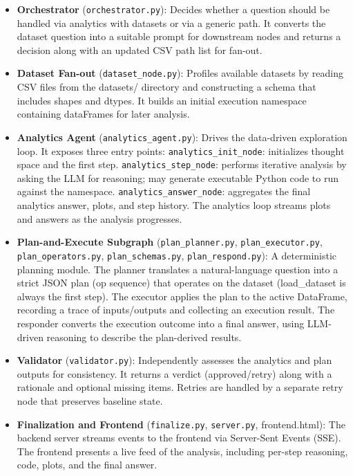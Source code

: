 \begin{itemize}
  \item \textbf{Orchestrator} (\texttt{orchestrator.py}):
    Decides whether a question should be handled via analytics with datasets or via a generic path.
    It converts the dataset question into a suitable prompt for downstream nodes and
    returns a decision along with an updated CSV path list for fan-out.

  \item \textbf{Dataset Fan-out} (\texttt{dataset\_node.py}):
    Profiles available datasets by reading CSV files from the datasets/ directory and
    constructing a schema that includes shapes and dtypes. It builds an initial execution
    namespace containing dataFrames for later analysis.

  \item \textbf{Analytics Agent} (\texttt{analytics\_agent.py}):
    Drives the data-driven exploration loop. It exposes three entry points:
    \subitem \texttt{analytics\_init\_node}: initializes thought space and the first step.
    \subitem \texttt{analytics\_step\_node}: performs iterative analysis by asking the LLM for
    reasoning; may generate executable Python code to run against the namespace.
    \subitem \texttt{analytics\_answer\_node}: aggregates the final analytics answer, plots, and step history.
    The analytics loop streams plots and answers as the analysis progresses.

  \item \textbf{Plan-and-Execute Subgraph} (\texttt{plan\_planner.py}, \texttt{plan\_executor.py}, \texttt{plan\_operators.py}, \texttt{plan\_schemas.py}, \texttt{plan\_respond.py}):
    A deterministic planning module.
    \subitem The planner translates a natural-language question into a strict JSON plan (op sequence)
    that operates on the dataset (load\_dataset is always the first step).
    \subitem The executor applies the plan to the active DataFrame, recording a trace of
    inputs/outputs and collecting an execution result.
    \subitem The responder converts the execution outcome into a final answer, using LLM-driven
    reasoning to describe the plan-derived results.

  \item \textbf{Validator} (\texttt{validator.py}):
    Independently assesses the analytics and plan outputs for consistency. It returns a verdict
    (approved/retry) along with a rationale and optional missing items. Retries are handled by a
    separate retry node that preserves baseline state.

  \item \textbf{Finalization and Frontend} (\texttt{finalize.py}, \texttt{server.py}, frontend.html):
    The backend server streams events to the frontend via Server-Sent Events (SSE). The frontend
    presents a live feed of the analysis, including per-step reasoning, code, plots, and the final
    answer.
\end{itemize}

